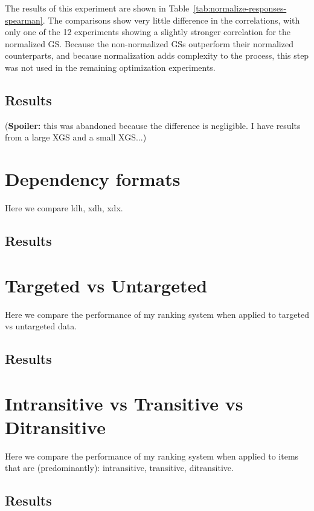 The results of this experiment are shown in Table~\ref{tab:normalize-responses-spearman}. The comparisons show very little difference in the correlations, with only one of the 12 experiments showing a slightly stronger correlation for the normalized GS. Because the non-normalized GSs outperform their normalized counterparts, and because normalization adds complexity to the process, this step was not used in the remaining optimization experiments.

\subsection{Results}
\label{subsection:normalizing-length-results}
(\textbf{Spoiler:} this was abandoned because the difference is negligible. I have results from a large XGS and a small XGS...)

\section{Dependency formats}
\label{section:experiment-dependency-formats}
Here we compare ldh, xdh, xdx.
\subsection{Results}
\label{subsection:dependency-formats-results}

\section{Targeted vs Untargeted}
\label{section:experiment-targeted}
Here we compare the performance of my ranking system when applied to targeted vs untargeted data.
\subsection{Results}
\label{subsection:targeted-results}

\section{Intransitive vs Transitive vs Ditransitive}
\label{section:experiment-transitive}
Here we compare the performance of my ranking system when applied to items that are (predominantly): intransitive, transitive, ditransitive.
\subsection{Results}
\label{subsection:transitive-results}

